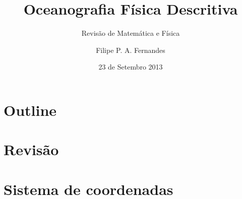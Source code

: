 \title[Aula 04]{Oceanografia Física Descritiva}
\subtitle{Revisão de Matemática e Física}
\author[Filipe Fernandes]{Filipe P. A. Fernandes}
\date[Setembro 2013]{23 de Setembro 2013}




\begin{frame}[plain]
  \titlepage
\end{frame}

\section*{Outline}
\begin{frame}
\tableofcontents
\end{frame}

\section{Revisão}
\section{Sistema de coordenadas}


